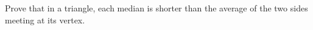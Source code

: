 Prove that in a triangle, each median is shorter than the average of the two sides meeting at its vertex.
